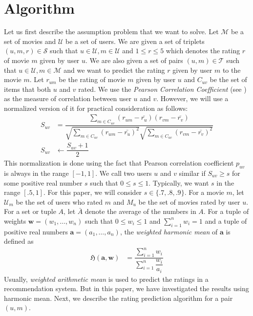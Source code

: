 \documentclass[manuscript,screen,review]{acmart}
\begin{document}
	\section{Algorithm}
	Let us first describe the assumption problem that we want to solve. Let $\mathcal{M}$ be a set of movies and $\mathcal{U}$ be a set of users. We are given a set of triplets $(u,m,r)\in\mathcal{S}$ such that $u\in\mathcal{U},m\in\mathcal{U}$ and $1\leq r\leq 5$ which denotes the rating $r$ of movie $m$ given by user $u$. We are also given a set of pairs $(u,m)\in\mathcal{T}$ such that $u\in\mathcal{U},m\in\mathcal{M}$ and we want to predict the rating $r$ given by user $m$ to the movie $m$. Let $r_{um}$ be the rating of movie $m$ given by user $u$ and $C_{uv}$ be the set of items that both $u$ and $v$ rated. We use the \textit{Pearson Correlation Coefficient} (see \textcite{freedman2007statistics}) as the measure of correlation between user $u$ and $v$. However, we will use a normalized version of it for practical consideration as follows:
	\begin{align*}
		S_{uv}
		& = \dfrac{\sum_{m\in C_{uv}}(r_{um}-\bar{r_{u}})(r_{vm}-\bar{r_{v}})}{\sqrt{\sum_{m\in C_{uv}}(r_{um}-\bar{r_{u}})^{2}}\sqrt{\sum_{m\in C_{uv}}(r_{vm}-\bar{r_{v}})^{2}}}\\
		S_{uv}
		& \leftarrow \dfrac{S_{uv}+1}{2}
	\end{align*}
	This normalization is done using the fact that Pearson correlation coefficient $p_{uv}$ is always in the range $[-1,1]$. We call two users $u$ and $v$ similar if $S_{uv}\geq s$ for some positive real number $s$ such that $0\leq s\leq 1$. Typically, we want $s$ in the range $[.5, 1]$. For this paper, we will consider $s\in\{.7,.8,.9\}$. For a movie $m$, let $\mathcal{U}_{m}$ be the set of users who rated $m$ and $M_{u}$ be the set of movies rated by user $u$. For a set or tuple $A$, let $\bar{A}$ denote the average of the numbers in $A$. For a tuple of weights $\mathbf{w}=(w_{1},\ldots,w_{n})$ such that $0\leq w_{i}\leq 1$ and $\sum_{i=1}^{n}w_{i}=1$ and a tuple of positive real numbers $\mathbf{a}=(a_{1},\ldots,a_{n})$, the \textit{weighted harmonic mean} of $\mathbf{a}$ is defined as
	\begin{align*}
		\mathfrak{H}(\mathbf{a},\mathbf{w})
		& = \dfrac{\sum_{i=1}^{n}w_{i}}{\sum_{i=1}^{n}\dfrac{w_{i}}{a_{i}}}
	\end{align*}
	Usually, \textit{weighted arithmetic mean} is used to predict the ratings in a recommendation system. But in this paper, we have investigated the results using harmonic mean. Next, we describe the rating prediction algorithm for a pair $(u,m)$.
\end{document}
